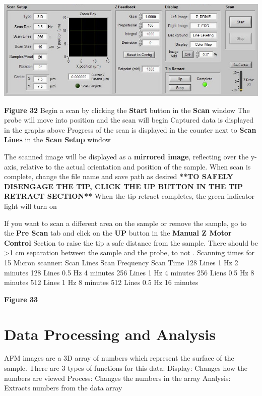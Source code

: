 \documentclass{../lab}
\begin{document}
\textbf{}

\begin{center}
    \href{http://experimentationlab.berkeley.edu/sites/default/files/AFMImages/toposcansetup.jpg}{\includegraphics[width=0.5\linewidth]{images/toposcansetup.jpg}}
\end{center}


\textbf{Figure 32}
Begin a scan by clicking the \textbf{Start} button in the \textbf{Scan} window
The probe will move into position and the scan will begin
Captured data is displayed in the graphs above
Progress of the scan is displayed in the counter next to \textbf{Scan Lines} in the \textbf{Scan Setup} window

The scanned image will be displayed as a \textbf{mirrored image}, reflecting over the y-axis, relative to the actual orientation and position of the sample.
When scan is complete, change the file name and save path as desired
\textbf{**TO SAFELY DISENGAGE THE TIP, CLICK THE UP BUTTON IN THE TIP RETRACT SECTION**}
When the tip retract completes, the green indicator light will turn on

If you want to scan a different area on the sample or remove the sample, go to the \textbf{Pre Scan }tab and click on the \textbf{UP }button in the \textbf{Manual Z Motor Control }Section to raise the tip a safe distance from the sample.  There should be >1 cm separation between the sample and the probe, to not \textbf{}.
Scanning times for 15 Micron scanner:
Scan Lines
Scan Frequency
Scan Time
128 Lines
1 Hz
2 minutes
128 Lines
0.5 Hz
4 minutes
256 Lines
1 Hz
4 minutes
256 Liens
0.5 Hz
8 minutes
512 Lines
1 Hz
8 minutes
512 Lines
0.5 Hz
16 minutes

\textbf{Figure 33}
\textbf{}



\section{Data Processing and Analysis}
AFM images are a 3D array of numbers which represent the surface of the sample.  There are 3 types of functions for this data:
Display:  Changes how the numbers are viewed
Process: Changes the numbers in the array
Analysis:  Extracts numbers from the data array
\end{document}
